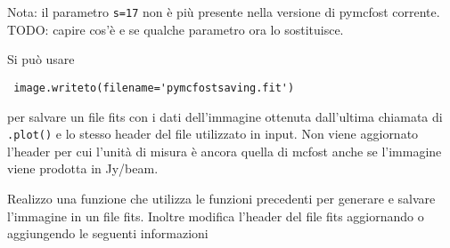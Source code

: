 \documentclass[DIN, pagenumber=false, fontsize=11pt, parskip=half]{scrartcl}
\begin{document}
Nota: il parametro \lstinline{s=17} non è più presente nella versione di pymcfost corrente. TODO: capire cos'è e se qualche parametro ora lo sostituisce.

Si può usare
\begin{lstlisting}
 image.writeto(filename='pymcfostsaving.fit')
\end{lstlisting}
per salvare un file fits con i dati dell'immagine ottenuta dall'ultima chiamata di \lstinline{.plot()} e lo stesso header del file utilizzato in input. Non viene aggiornato l'header per cui l'unità di misura è ancora quella di mcfost anche se l'immagine viene prodotta in Jy/beam.       

Realizzo una funzione che utilizza le funzioni precedenti per generare e salvare l'immagine in un file fits. Inoltre modifica l'header del file fits aggiornando o aggiungendo le seguenti informazioni
\end{document}
